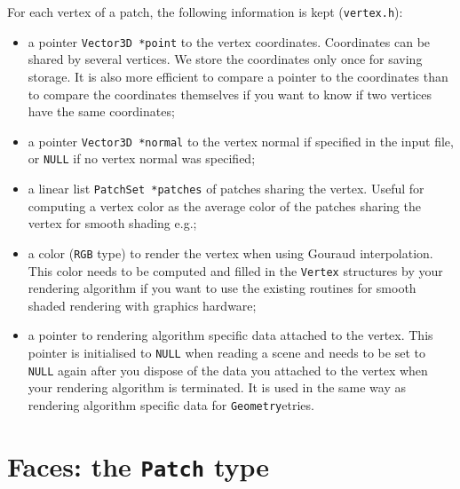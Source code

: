 \documentclass[11pt]{report}
\begin{document}
For each vertex of a patch, the following information is kept ({\tt vertex.h}):
\begin{itemize}
\item   a pointer {\tt Vector3D *point} to the vertex coordinates. Coordinates
  can be shared by several vertices. We store the coordinates only once
  for saving storage. It is also more efficient to compare a pointer to
  the coordinates than to compare the coordinates themselves if you want to
  know if two vertices have the same coordinates;
\item   a pointer {\tt Vector3D *normal} to the vertex normal if specified in the
  input file, or {\tt NULL} if no vertex normal was specified;
\item   a linear list {\tt PatchSet *patches} of patches sharing the vertex.
  Useful for computing a vertex color as the average color of the patches
  sharing the vertex for smooth shading e\@.g\@.;
\item   a color ({\tt RGB} type) to render the vertex when using Gouraud
  interpolation. This color needs to be computed and filled in the {\tt Vertex}
  structures by your rendering algorithm if you want to use the existing
  routines for smooth shaded rendering with graphics hardware;
\item   a pointer to rendering algorithm specific data attached to the
  vertex. This pointer is initialised to {\tt NULL} when reading a scene
  and needs to be set to {\tt NULL} again after you dispose of the data
  you attached to the vertex when your rendering algorithm is terminated.
  It is used in the same way as rendering algorithm specific data for 
  {\tt Geometry}etries.
\end{itemize}

\section{Faces: the {\tt Patch} type}
\label{patches}
\end{document}
